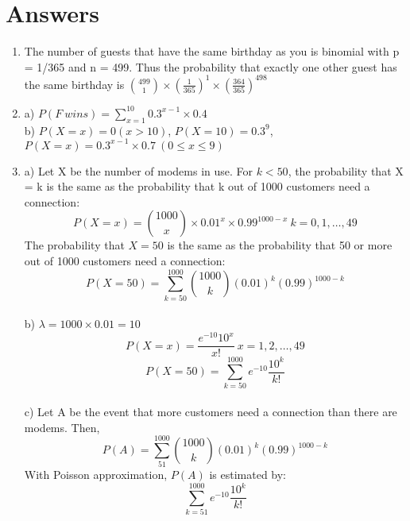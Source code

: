 \documentclass[11pt]{article}
\begin{document}
\section{Answers}
\begin{enumerate}
  \item The number of guests that have the same birthday as you is binomial with p = 1/365 and n = 499. Thus the probability that exactly one other guest has the same birthday is
  ${499 \choose 1} \times (\frac{1}{365})^1 \times (\frac{364}{365})^{498}$
  \item 
  a) $P(F \: wins) = \sum_{x=1}^{10} 0.3^{x-1} \times 0.4$
  \\ b) $P(X=x) = 0 (x > 10)$, $P(X=10) = 0.3^9 $, $P(X=x) = 0.3^{x-1} \times 0.7 \: (0 \leq x \leq 9)$
  \item 
  a) Let X be the number of modems in use. For $k < 50$, the probability that X = k is the same as the probability that k out of 1000 customers need a connection:
  $$P(X=x) = {1000 \choose x} \times 0.01^{x} \times 0.99^{1000 - x} \: k = 0,1,\ldots,49$$
  The probability that $X = 50$ is the same as the probability that 50 or more out of 1000 customers need a connection:
  $$P(X=50) = \sum_{k=50}^{1000} {1000 \choose k} (0.01)^k(0.99)^{1000-k} $$
  \\ b) $\lambda = 1000 \times 0.01 = 10$ 
  $$P(X=x) = \frac{e^{-10} 10^x }{x!} \: x = 1,2,\ldots,49$$
  $$P(X=50) = \sum_{k=50}^{1000}e^{-10}\frac{10^k}{k!}$$
  \\ c) Let A be the event that more customers need a connection than there are modems. Then, 
  $$P(A) = \sum_{51}^{1000}{1000 \choose k} (0.01)^k (0.99)^{1000-k}$$
  With Poisson approximation, $P(A)$ is estimated by:
  $$\sum_{k=51}^{1000}e^{-10}\frac{10^k}{k!}$$
\end{enumerate}
\end{document}
